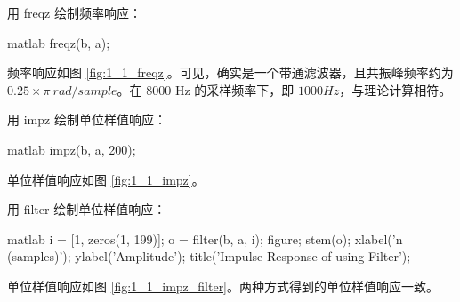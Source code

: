 \documentclass[a4paper]{article}  %
\begin{document}
用 freqz 绘制频率响应：
\begin{codeblock}{matlab}
    freqz(b, a);
\end{codeblock}
频率响应如图 \ref{fig:1_1_freqz}。可见，确实是一个带通滤波器，且共振峰频率约为 $0.25\times\pi\ rad/sample$。在 8000 Hz 的采样频率下，即 $1000 Hz$，与理论计算相符。

用 impz 绘制单位样值响应：
\begin{codeblock}{matlab}
    impz(b, a, 200);
\end{codeblock}
单位样值响应如图 \ref{fig:1_1_impz}。

用 filter 绘制单位样值响应：
\begin{codeblock}{matlab}
i = [1, zeros(1, 199)];
o = filter(b, a, i);
figure;
stem(o);
xlabel('n (samples)');
ylabel('Amplitude');
title('Impulse Response of using Filter');
\end{codeblock}
单位样值响应如图 \ref{fig:1_1_impz_filter}。两种方式得到的单位样值响应一致。
\end{document}

